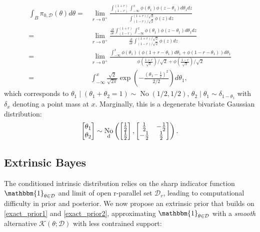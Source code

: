 \documentclass[10pt]{article}
\newcommand{\mc}[1]{\mathcal{#1}}
\DeclareMathOperator{\No}{No}
\DeclareMathOperator{\1}{\mathbbm{1}}
\begin{document}
\begin{equation*}
	\begin{aligned}
\int_{B} \pi_{0,\mc D}(\theta) d\theta= 
& \lim_{r\rightarrow 0^+}\frac{
	\int_{(1-r)}^{(1+r)} \int_{-\infty}^{x} \phi(\theta_1)\phi(z-\theta_1) d\theta_1 dz  
}{
\int_{(1-r)/\sqrt 2}^{(1+r)/\sqrt 2} \phi(z) dz
} \\ 
= & \lim_{r\rightarrow 0^+}\frac{ \frac{\partial}{\partial r}
	\int_{(1-r)}^{(1+r)} \int_{-\infty}^{x} \phi(\theta_1)\phi(z-\theta_1) d\theta_1 dz  
}{
\frac{\partial}{\partial r}\int_{(1-r)/\sqrt 2}^{(1+r)/\sqrt 2} \phi(z) dz
} \\ 
= &  
\lim_{r\rightarrow 0^+}\frac{
	\int_{-\infty}^{x} \phi(\theta_1)\left( \phi({1+r} -\theta_1) d\theta_1  +  \phi({1-r}-\theta_1)\right) d\theta_1  
}{\phi (\frac{1+r}{\sqrt 2})/\sqrt 2 + \phi (\frac{1-r}{\sqrt 2})/\sqrt 2} \\
= & \int_{-\infty}^{x} \frac{\sqrt{2}}{\sqrt{2\pi}} \exp(-\frac{(\theta_1-\frac{1}{2})^2}{2/2}) d\theta_1,
\end{aligned}
\end{equation*}
which corresponds to $\theta_1\mid (\theta_1+ \theta_2=1) \sim \No(1/2,1/2)$, $\theta_2\mid \theta_1 \sim \delta_{1-\theta_1}$ with $\delta_x$ denoting a point mass at $x$. Marginally, this is a degenerate bivariate Gaussian distribution:
$$\begin{bmatrix} \theta_1 \\ \theta_2 \end{bmatrix} \sim
\No_{\text d} \left(
 \begin{bmatrix} \frac{1}{2} \\ \frac{1}{2} \end{bmatrix},
\begin{bmatrix} \frac{1}{2} & -\frac{1}{2}  \\  -\frac{1}{2}  & \frac{1}{2} \end{bmatrix}
\right).$$



\subsection{Extrinsic Bayes}
The conditioned intrinsic distribution relies on the sharp indicator function $\mathbbm{1}_{\theta\in \mc D}$ and limit of open r-parallel set $\mc D_r$, leading to computational difficulty in prior and posterior. We now propose an extrinsic prior that builds on \eqref{exact_prior1} and \eqref{exact_prior2}, approximating $\mathbbm{1}_{\theta\in \mc D}$ with a {\em smooth} alternative $\mc{K}( \theta; \mc D)$ with less contrained support:
\end{document}
